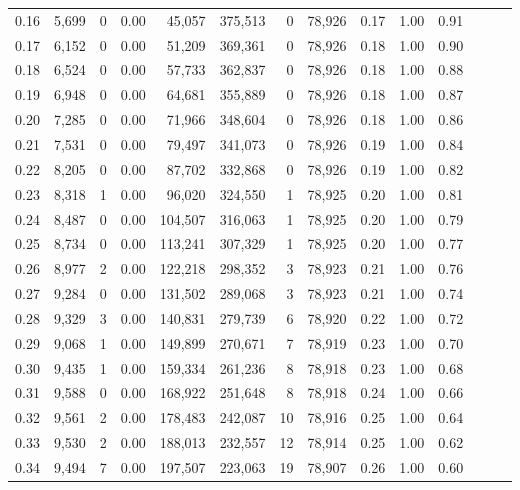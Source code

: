 \begin{tabular}{rrrrrrrrrrrrrr}
0.16 &  5,699 &      0 &  0.00 &   45,057 &  375,513 &       0 &  78,926 &  0.17 &  1.00 &      0.91 \\
0.17 &  6,152 &      0 &  0.00 &   51,209 &  369,361 &       0 &  78,926 &  0.18 &  1.00 &      0.90 \\
0.18 &  6,524 &      0 &  0.00 &   57,733 &  362,837 &       0 &  78,926 &  0.18 &  1.00 &      0.88 \\
0.19 &  6,948 &      0 &  0.00 &   64,681 &  355,889 &       0 &  78,926 &  0.18 &  1.00 &      0.87 \\
0.20 &  7,285 &      0 &  0.00 &   71,966 &  348,604 &       0 &  78,926 &  0.18 &  1.00 &      0.86 \\
0.21 &  7,531 &      0 &  0.00 &   79,497 &  341,073 &       0 &  78,926 &  0.19 &  1.00 &      0.84 \\
0.22 &  8,205 &      0 &  0.00 &   87,702 &  332,868 &       0 &  78,926 &  0.19 &  1.00 &      0.82 \\
0.23 &  8,318 &      1 &  0.00 &   96,020 &  324,550 &       1 &  78,925 &  0.20 &  1.00 &      0.81 \\
0.24 &  8,487 &      0 &  0.00 &  104,507 &  316,063 &       1 &  78,925 &  0.20 &  1.00 &      0.79 \\
0.25 &  8,734 &      0 &  0.00 &  113,241 &  307,329 &       1 &  78,925 &  0.20 &  1.00 &      0.77 \\
0.26 &  8,977 &      2 &  0.00 &  122,218 &  298,352 &       3 &  78,923 &  0.21 &  1.00 &      0.76 \\
0.27 &  9,284 &      0 &  0.00 &  131,502 &  289,068 &       3 &  78,923 &  0.21 &  1.00 &      0.74 \\
0.28 &  9,329 &      3 &  0.00 &  140,831 &  279,739 &       6 &  78,920 &  0.22 &  1.00 &      0.72 \\
0.29 &  9,068 &      1 &  0.00 &  149,899 &  270,671 &       7 &  78,919 &  0.23 &  1.00 &      0.70 \\
0.30 &  9,435 &      1 &  0.00 &  159,334 &  261,236 &       8 &  78,918 &  0.23 &  1.00 &      0.68 \\
0.31 &  9,588 &      0 &  0.00 &  168,922 &  251,648 &       8 &  78,918 &  0.24 &  1.00 &      0.66 \\
0.32 &  9,561 &      2 &  0.00 &  178,483 &  242,087 &      10 &  78,916 &  0.25 &  1.00 &      0.64 \\
0.33 &  9,530 &      2 &  0.00 &  188,013 &  232,557 &      12 &  78,914 &  0.25 &  1.00 &      0.62 \\
0.34 &  9,494 &      7 &  0.00 &  197,507 &  223,063 &      19 &  78,907 &  0.26 &  1.00 &      0.60 \\

\end{tabular}
